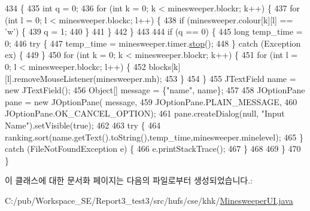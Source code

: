 \begin{DoxyCode}
434                             \{
435         \textcolor{keywordtype}{int} q = 0;
436         \textcolor{keywordflow}{for} (\textcolor{keywordtype}{int} k = 0; k < minesweeper.blockr; k++) \{
437             \textcolor{keywordflow}{for} (\textcolor{keywordtype}{int} l = 0; l < minesweeper.blockc; l++) \{
438                 \textcolor{keywordflow}{if} (minesweeper.colour[k][l] == \textcolor{charliteral}{'w'}) \{
439                     q = 1;
440                 \}
441             \}
442         \}
443  
444         \textcolor{keywordflow}{if} (q == 0) \{
445             \textcolor{keywordtype}{long} temp\_time = 0;
446             \textcolor{keywordflow}{try} \{
447                 temp\_time = minesweeper.timer.\hyperlink{classhufs_1_1cse_1_1khk_1_1_timer_a5ab9e7bd1e1b1f74604887cd99b27972}{stop}();
448             \} \textcolor{keywordflow}{catch} (Exception ex) \{                        
449             \}
450             \textcolor{keywordflow}{for} (\textcolor{keywordtype}{int} k = 0; k < minesweeper.blockr; k++) \{
451                 \textcolor{keywordflow}{for} (\textcolor{keywordtype}{int} l = 0; l < minesweeper.blockc; l++) \{
452                     blocks[k][l].removeMouseListener(minesweeper.mh);
453                 \}
454             \}
455             JTextField name = \textcolor{keyword}{new} JTextField();
456             Object[] message = \{\textcolor{stringliteral}{"name"}, name\};
457 
458             JOptionPane pane = \textcolor{keyword}{new} JOptionPane( message, 
459                     JOptionPane.PLAIN\_MESSAGE, 
460                     JOptionPane.OK\_CANCEL\_OPTION);
461             pane.createDialog(null, \textcolor{stringliteral}{"Input Name"}).setVisible(\textcolor{keyword}{true});
462             
463             \textcolor{keywordflow}{try} \{
464                 ranking.sort(name.getText().toString(),temp\_time,minesweeper.minelevel);
465             \} \textcolor{keywordflow}{catch} (FileNotFoundException e) \{
466                 e.printStackTrace();
467             \}
468 
469         \}
470     \}   
\end{DoxyCode}


이 클래스에 대한 문서화 페이지는 다음의 파일로부터 생성되었습니다.\+:\begin{DoxyCompactItemize}
\item 
C\+:/pub/\+Workspace\+\_\+\+S\+E/\+Report3\+\_\+test3/src/hufs/cse/khk/\hyperlink{_minesweeper_u_i_8java}{Minesweeper\+U\+I.\+java}\end{DoxyCompactItemize}
